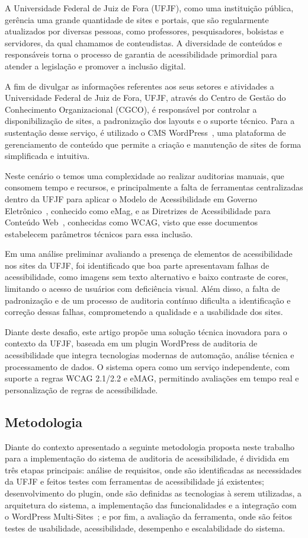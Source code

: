 \documentclass[12pt]{article}
\begin{document}
A Universidade Federal de Juiz de Fora (UFJF), como uma instituição pública,
gerência uma grande quantidade de sites e portais, que são regularmente
atualizados por diversas pessoas, como professores, pesquisadores, bolsistas e
servidores, da qual chamamos de conteudistas. A diversidade de conteúdos e
responsáveis torna o processo de garantia de acessibilidade primordial para
atender a legislação e promover a inclusão digital.

A fim de divulgar as informações referentes aos seus setores e atividades a
Universidade Federal de Juiz de Fora, UFJF, através do Centro de Gestão
do Conhecimento Organizacional (CGCO), é responsável por controlar a
disponibilização de sites, a padronização dos layouts e o suporte técnico. Para
a sustentação desse serviço, é utilizado o CMS WordPress~\autocite{WP},
uma plataforma de gerenciamento de conteúdo que permite a criação e
manutenção de sites de forma simplificada e intuitiva.

Neste cenário o temos uma complexidade ao realizar auditorias manuais, que
consomem tempo e recursos, e principalmente a falta de ferramentas
centralizadas dentro da UFJF para aplicar o Modelo de Acessibilidade em
Governo Eletrônico~\cite{emag}, conhecido como eMag, e as Diretrizes
de Acessibilidade para Conteúdo Web~\cite{wcag22}, conhecidas como
WCAG, visto que esse documentos estabelecem parâmetros técnicos para essa inclusão.

Em uma análise preliminar avaliando a presença de elementos de acessibilidade nos
sites da UFJF, foi identificado que boa parte apresentavam falhas de acessibilidade, como imagens sem texto
alternativo e baixo contraste de cores, limitando o acesso de usuários com deficiência
visual. Além disso, a falta de padronização e de um processo de auditoria contínuo
dificulta a identificação e correção dessas falhas, comprometendo a qualidade e a
usabilidade dos sites.

Diante deste desafio, este artigo propõe uma solução técnica inovadora
para o contexto da UFJF, baseada em um plugin WordPress de auditoria
de acessibilidade que integra tecnologias modernas de automação,
análise técnica e processamento de dados. O sistema opera como um serviço
independente, com suporte a regras WCAG 2.1/2.2 e eMAG, permitindo
avaliações em tempo real e personalização de regras de acessibilidade.

\subsection{Metodologia}\label{subsec:metodologia}
Diante do contexto apresentado a seguinte metodologia proposta neste trabalho
para a implementação do sistema de auditoria de acessibilidade, é dividida
em três etapas principais: análise de requisitos, onde são identificadas as
necessidades da UFJF e feitos testes com ferramentas de acessibilidade já
existentes; desenvolvimento do plugin, onde são definidas as tecnologias à serem
utilizadas, a arquitetura do sistema, a implementação das funcionalidades e a
integração com o WordPress Multi-Sites~\autocite{wp-ms}; e por fim, 
a avaliação da ferramenta,
onde são feitos testes de usabilidade, acessibilidade, desempenho e 
escalabilidade do sistema.
\end{document}
